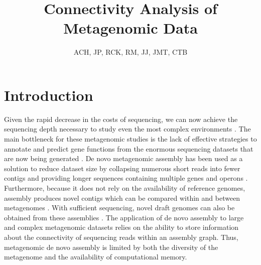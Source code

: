 \documentclass[11pt]{article} %
\begin{document}
\title{Connectivity Analysis of Metagenomic Data}
\author{ACH, JP, RCK, RM, JJ, JMT, CTB}
\maketitle

\section{Introduction}
Given the rapid decrease in the costs of sequencing, we can now achieve the sequencing depth necessary to study even the most complex environments \cite{Hess:2011p686,Qin:2010p189}.  The main bottleneck for these metagenomic studies is the lack of effective strategies to annotate and predict gene functions from the enormous sequencing datasets that are now being generated \cite{Hoff:2009p913,Kunin:2008p16,Noguchi:2006p968,Zhang:2012p959}.  De novo metagenomic assembly has been used as a solution to reduce dataset size by collapsing numerous short reads into fewer contigs and providing longer sequences containing multiple genes and operons \cite{Miller:2010p226,Pop:2009p798}.  Furthermore, because it does not rely on the availability of reference genomes, assembly produces novel contigs which can be compared within and between metagenomes \cite{Li:2009p707,Schloss:2008p2}.  With sufficient sequencing, novel draft genomes can also be obtained from these assemblies \cite{Hess:2011p686}.  The application of de novo assembly to large and complex metagenomic datasets relies on the ability to store information about the connectivity of sequencing reads within an assembly graph.  Thus, metagenomic de novo assembly is limited by both the diversity of the metagenome and the availability of computational memory.  
\end{document}

